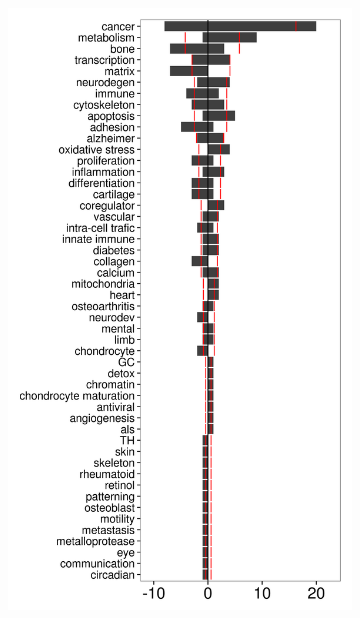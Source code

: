 \begin{figure}[!htbp]
\centering
\vspace{1\baselineskip}
%
\begin{subfigure}{0.49\textwidth}
	\includegraphics[width=\textwidth]
	{Figures/tfc-manualannot-antago/tfc-manualannot-antago-c.png}
	\caption{}
	\label{subfig:tfc-manualannot-antago-c}
\end{subfigure}

\end{figure}
